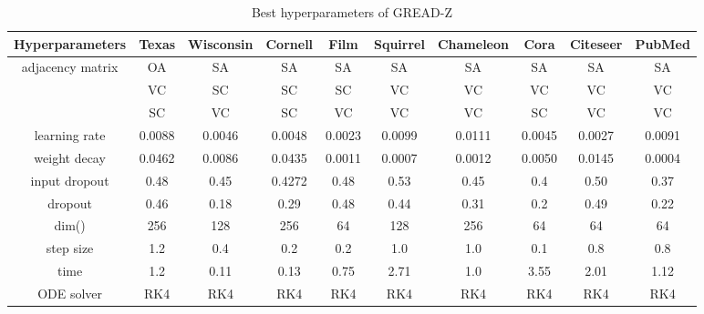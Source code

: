 \documentclass{article}
\theoremstyle{plain}
\theoremstyle{definition}
\theoremstyle{remark}
\begin{document}
\begin{table*}[ht!]
    \centering
    \small
    \caption{Best hyperparameters of GREAD-Z}
    \label{tab:best_Z}
    \begin{tabular}{c ccccccccc} \toprule
        Hyperparameters  & Texas  & Wisconsin 
                                          & Cornell& Film   & Squirrel 
                                                                      & Chameleon
                                                                               & Cora   & Citeseer 
                                                                                                 & PubMed\\ \midrule
        adjacency matrix & OA     & SA     & SA     & SA     & SA     & SA     & SA     & SA     & SA    \\
                 & VC     & SC     & SC     & SC     & VC     & VC     & VC     & VC     & VC    \\
                  & SC     & VC     & SC     & VC     & VC     & VC     & SC     & VC     & VC    \\
        learning rate    & 0.0088 & 0.0046 & 0.0048 & 0.0023 & 0.0099 & 0.0111 & 0.0045 & 0.0027 & 0.0091\\
        weight decay     & 0.0462 & 0.0086 & 0.0435 & 0.0011 & 0.0007 & 0.0012 & 0.0050 & 0.0145 & 0.0004\\
        input dropout    & 0.48   & 0.45   & 0.4272 & 0.48   & 0.53   & 0.45   & 0.4    & 0.50   & 0.37\\
        dropout          & 0.46   & 0.18   & 0.29   & 0.48   & 0.44   & 0.31   & 0.2    & 0.49   & 0.22\\
        dim()& 256    & 128    & 256    & 64     & 128    & 256    & 64     & 64     & 64\\
        step size  & 1.2    & 0.4    & 0.2    & 0.2    & 1.0    & 1.0    & 0.1    & 0.8    & 0.8\\
        time          & 1.2    & 0.11   & 0.13   & 0.75   & 2.71   & 1.0    & 3.55   & 2.01   & 1.12\\
        ODE solver       & RK4  & RK4  & RK4  & RK4    & RK4  & RK4    & RK4    & RK4    & RK4  \\
        \bottomrule
    \end{tabular}
\end{table*}
\end{document}
